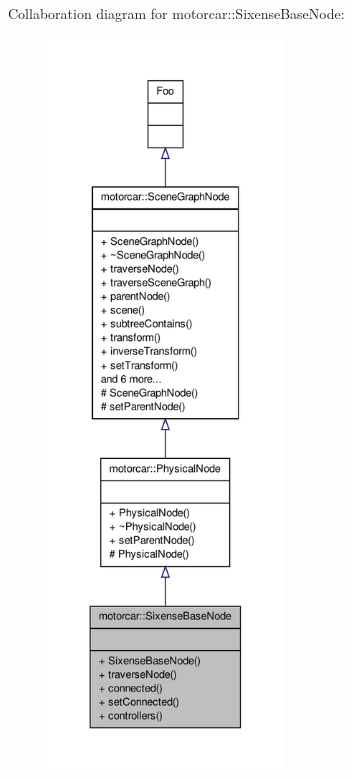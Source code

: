 Collaboration diagram for motorcar\-:\-:Sixense\-Base\-Node\-:
\nopagebreak
\begin{figure}[H]
\begin{center}
\leavevmode
\includegraphics[height=550pt]{classmotorcar_1_1SixenseBaseNode__coll__graph}
\end{center}
\end{figure}
